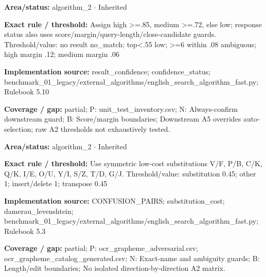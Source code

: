 \begin{tcolorbox}[enhanced,breakable,colback=white,colframe=Muted!45,boxrule=0.45pt,arc=1.5pt,left=6pt,right=6pt,top=5pt,bottom=5pt,title={\texttt{A2-CONFIDENCE-13}},title after break={\texttt{A2-CONFIDENCE-13}\ (continued)},fonttitle=\headingfont\bfseries\color{Navy},coltitle=Navy]
\textbf{Area/status:} algorithm\_\allowbreak{}2 $\boldsymbol{\cdot}$ Inherited\par
\smallskip
\textbf{Exact rule / threshold:} Assign high >=.85, medium >=.72, else low; response status also uses score/\allowbreak{}margin/\allowbreak{}query-length/\allowbreak{}close-candidate guards. Threshold/\allowbreak{}value: no result no\_\allowbreak{}match; top<.55 low; >=6 within .08 ambiguous; high margin .12; medium margin .06\par
\smallskip
\textbf{Implementation source:} result\_\allowbreak{}confidence; confidence\_\allowbreak{}status; benchmark\_\allowbreak{}01\_\allowbreak{}legacy/\allowbreak{}external\_\allowbreak{}algorithms/\allowbreak{}english\_\allowbreak{}search\_\allowbreak{}algorithm\_\allowbreak{}fast.py; Rulebook 5.10\par
\smallskip
\textbf{Coverage / gap:} partial; P: unit\_\allowbreak{}test\_\allowbreak{}inventory.csv; N: Always-confirm downstream guard; B: Score/\allowbreak{}margin boundaries; Downstream A5 overrides auto-selection; raw A2 thresholds not exhaustively tested.
\end{tcolorbox}
\begin{tcolorbox}[enhanced,breakable,colback=white,colframe=Muted!45,boxrule=0.45pt,arc=1.5pt,left=6pt,right=6pt,top=5pt,bottom=5pt,title={\texttt{A2-CONFUSION-COST-05}},title after break={\texttt{A2-CONFUSION-COST-05}\ (continued)},fonttitle=\headingfont\bfseries\color{Navy},coltitle=Navy]
\textbf{Area/status:} algorithm\_\allowbreak{}2 $\boldsymbol{\cdot}$ Inherited\par
\smallskip
\textbf{Exact rule / threshold:} Use symmetric low-cost substitutions V/\allowbreak{}F, P/\allowbreak{}B, C/\allowbreak{}K, Q/\allowbreak{}K, I/\allowbreak{}E, O/\allowbreak{}U, Y/\allowbreak{}I, S/\allowbreak{}Z, T/\allowbreak{}D, G/\allowbreak{}J. Threshold/\allowbreak{}value: substitution 0.45; other 1; insert/\allowbreak{}delete 1; transpose 0.45\par
\smallskip
\textbf{Implementation source:} CONFUSION\_\allowbreak{}PAIRS; substitution\_\allowbreak{}cost; damerau\_\allowbreak{}levenshtein; benchmark\_\allowbreak{}01\_\allowbreak{}legacy/\allowbreak{}external\_\allowbreak{}algorithms/\allowbreak{}english\_\allowbreak{}search\_\allowbreak{}algorithm\_\allowbreak{}fast.py; Rulebook 5.3\par
\smallskip
\textbf{Coverage / gap:} partial; P: ocr\_\allowbreak{}grapheme\_\allowbreak{}adversarial.csv; ocr\_\allowbreak{}grapheme\_\allowbreak{}catalog\_\allowbreak{}generated.csv; N: Exact-name and ambiguity guards; B: Length/\allowbreak{}edit boundaries; No isolated direction-by-direction A2 matrix.
\end{tcolorbox}
